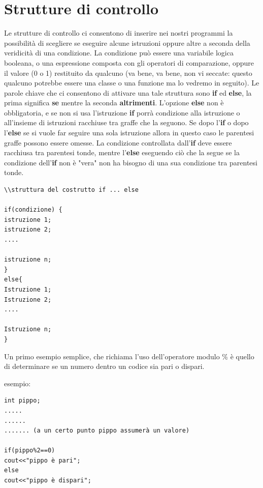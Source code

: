 \documentclass[11pt,fleqn]{book} %
\begin{document}
\section{Strutture di controllo}

Le strutture di controllo ci consentono di inserire nei nostri programmi la possibilità di scegliere se eseguire alcune istruzioni oppure altre a seconda della veridicità di una condizione.
La condizione può essere una variabile logica booleana, o una espressione composta con gli operatori di comparazione, oppure il valore (0 o 1) restituito da qualcuno (va bene, va bene, non vi seccate: questo qualcuno potrebbe essere una classe o una funzione ma lo vedremo in seguito).
Le parole chiave che ci consentono di attivare una tale struttura sono \textbf{if} ed \textbf{else}, la prima significa \textbf{se} mentre la seconda \textbf{altrimenti}. L'opzione \textbf{else} non è obbligatoria, e se non si usa l'istruzione \textbf{if} porrà condizione alla istruzione o all'insieme di istruzioni racchiuse tra graffe che la seguono.
Se dopo l'\textbf{if} o dopo l'\textbf{else} se si vuole far seguire una sola istruzione allora in questo caso le parentesi graffe possono essere omesse. La condizione controllata dall'\textbf{if} deve essere racchiusa tra parentesi tonde, mentre l'\textbf{else} eseguendo ciò che la segue se la condizione dell'\textbf{if} non è "vera" non ha bisogno di una sua condizione tra parentesi tonde.

\begin{verbatim}
\\struttura del costrutto if ... else

if(condizione) {
istruzione 1;
istruzione 2;
....

istruzione n;
}
else{
Istruzione 1;
Istruzione 2;
....

Istruzione n;
}
\end{verbatim}


Un primo esempio semplice, che richiama l'uso dell'operatore modulo \% è quello di determinare se un numero dentro un codice sia pari o dispari.

esempio:
\begin{verbatim}
int pippo;
.....
......
....... (a un certo punto pippo assumerà un valore)

if(pippo%2==0)
cout<<"pippo è pari";
else
cout<<"pippo è dispari";
\end{verbatim}
\end{document}
